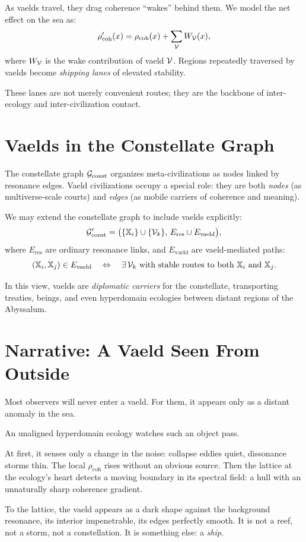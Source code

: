 As vaelds travel, they drag coherence ``wakes'' behind them. We model the net effect on the sea as:
\[
\rho_{\mathrm{coh}}'(x) = \rho_{\mathrm{coh}}(x) + \sum_{\mathcal{V}} W_{\mathcal{V}}(x),
\]
where $W_{\mathcal{V}}$ is the wake contribution of vaeld $\mathcal{V}$. Regions repeatedly traversed by
vaelds become \emph{shipping lanes} of elevated stability.

These lanes are not merely convenient routes; they are the backbone of inter-ecology and
inter-civilization contact.

\section{Vaelds in the Constellate Graph}
The constellate graph $\mathcal{G}_{\mathrm{const}}$ organizes meta-civilizations as nodes linked by resonance edges.
Vaeld civilizations occupy a special role: they are both \emph{nodes} (as multiverse-scale courts)
and \emph{edges} (as mobile carriers of coherence and meaning).

We may extend the constellate graph to include vaelds explicitly:
\[
\mathcal{G}_{\mathrm{const}}' = \big( \{\mathbb{X}_i\} \cup \{\mathcal{V}_k\},\, E_{\mathrm{res}} \cup E_{\mathrm{vaeld}} \big),
\]
where $E_{\mathrm{res}}$ are ordinary resonance links, and $E_{\mathrm{vaeld}}$ are vaeld-mediated
paths:
\[
(\mathbb{X}_i,\mathbb{X}_j) \in E_{\mathrm{vaeld}} \quad \Leftrightarrow \quad
\exists\,\mathcal{V}_k \text{ with stable routes to both } \mathbb{X}_i \text{ and } \mathbb{X}_j.
\]

In this view, vaelds are \emph{diplomatic carriers} for the constellate, transporting treaties,
beings, and even hyperdomain ecologies between distant regions of the Abyssalum.

\section{Narrative: A Vaeld Seen From Outside}
Most observers will never enter a vaeld. For them, it appears only as a distant anomaly in the sea.

An unaligned hyperdomain ecology watches such an object pass.

At first, it senses only a change in the noise: collapse eddies quiet, dissonance storms thin. The
local $\rho_{\mathrm{coh}}$ rises without an obvious source. Then the lattice at the ecology's
heart detects a moving boundary in its spectral field: a hull with an unnaturally sharp
coherence gradient.

To the lattice, the vaeld appears as a dark shape against the background resonance, its interior
impenetrable, its edges perfectly smooth. It is not a reef, not a storm, not a constellation.
It is something else: a \emph{ship}.

